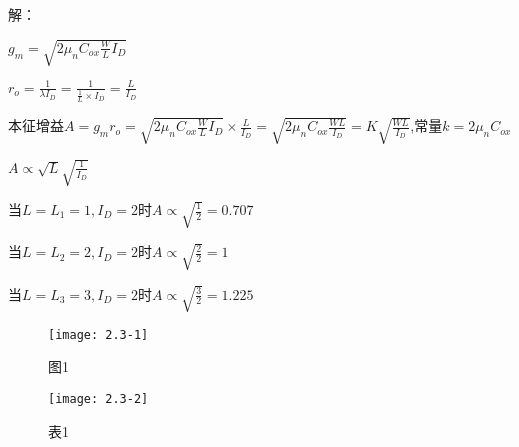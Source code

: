 



解：

$g_m=\sqrt{2\mu_nC_{ox}\frac{W}{L}I_D}$

$r_o=\frac{1}{\lambda I_D}=\frac{1}{\frac{1}{L} \times I_D}=\frac{L}{I_D}$

本征增益$A=g_mr_o=\sqrt{2\mu_nC_{ox}\frac{W}{L}I_D} \times \frac{L}{I_D}=\sqrt{2\mu_nC_{ox}\frac{WL}{I_D}}=K\sqrt{\frac{WL}{I_D}}$,常量$k=2\mu_nC_{ox}$

$A \propto \sqrt{L}\sqrt{\frac{1}{I_D}}$

当$L=L_1=1,I_D=2 \text{时}A \propto \sqrt{\frac{1}{2}}=0.707$

当$L=L_2=2,I_D=2 \text{时}A \propto \sqrt{\frac{2}{2}}=1$

当$L=L_3=3,I_D=2 \text{时}A \propto \sqrt{\frac{3}{2}}=1.225$

		\begin{figure}[H] %
	\begin{minipage}{\linewidth}
		\texttt{[image: 2.3-1]}
	\end{minipage}
		\caption*{图1} %
\end{figure}

\begin{figure}[H] %
	\begin{minipage}{\linewidth}
		\texttt{[image: 2.3-2]}
	\end{minipage}
		\caption*{表1} %
\end{figure}
